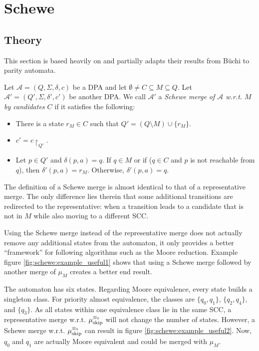 
\chapter{Schewe}
\label{chap:schewe}

\section{Theory}

This section is based heavily on \cite{Schewe2010} and partially adapts their results from B\"uchi to parity automata.

\begin{defn}
		Let $\mathcal{A} = (Q, \Sigma, \delta, c)$ be a DPA and let $\emptyset \neq C \subseteq M \subseteq Q$. Let $\mathcal{A}' = (Q', \Sigma, \delta', c')$ be another DPA. We call $\mathcal{A}'$ a \emph{Schewe merge of $\mathcal{A}$ w.r.t. $M$ by candidates $C$} if it satisfies the following:
	\begin{itemize}
		\item There is a state $r_M \in C$ such that $Q' = (Q \setminus M) \cup \{r_M\}$.
		\item $c' = c\upharpoonright_{Q'}$.
		\item Let $p \in Q'$ and $\delta(p, a) = q$. If $q \in M$ or if ($q \in C$ and $p$ is not reachable from $q$), then $\delta'(p, a) = r_M$. Otherwise, $\delta'(p, a) = q$. 
	\end{itemize}
\end{defn}

The definition of a Schewe merge is almost identical to that of a representative merge. The only difference lies therein that some additional transitions are redirected to the representative: when a transition leads to a candidate that is not in $M$ while also moving to a different SCC.

Using the Schewe merge instead of the representative merge does not actually remove any additional states from the automaton, it only provides a better \enquote{framework} for following algorithms such as the Moore reduction. Example figure \ref{fig:schewe:example_useful1} shows that using a Schewe merge followed by another merge of $\mu_M$ creates a better end result.

The automaton has six states. Regarding Moore equivalence, every state builds a singleton class. For priority almost equivalence, the classes are $\{q_0, q_1\}$, $\{q_2, q_4\}$, and $\{q_3\}$. As all states within one equivalence class lie in the same SCC, a representative merge w.r.t. $\mu_\text{skip}^{\equiv_\text{\Ankh}}$ will not change the number of states. However, a Schewe merge w.r.t. $\mu_\text{skip}^{\equiv_\text{\Ankh}}$ can result in figure \ref{fig:schewe:example_useful2}. Now, $q_0$ and $q_1$ are actually Moore equivalent and could be merged with $\mu_M$.

